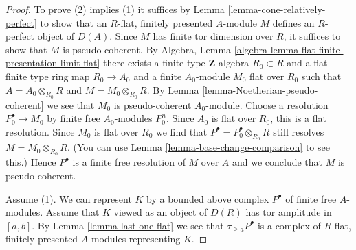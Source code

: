 \documentclass[10pt,a4paper]{amsart}
\theoremstyle{plain}
\theoremstyle{definition}
\theoremstyle{remark}
\numberwithin{equation}{subsection}
\begin{document}
\begin{proof}
To prove (2) implies (1) it suffices by
Lemma \ref{lemma-cone-relatively-perfect}
to show that an $R$-flat, finitely presented $A$-module $M$ defines
an $R$-perfect object of $D(A)$. Since $M$ has finite tor dimension
over $R$, it suffices to show that $M$ is pseudo-coherent. By
Algebra, Lemma \ref{algebra-lemma-flat-finite-presentation-limit-flat}
there exists a finite type $\mathbf{Z}$-algebra $R_0 \subset R$
and a flat finite type ring map $R_0 \to A_0$ and
a finite $A_0$-module $M_0$ flat over $R_0$ such that
$A = A_0 \otimes_{R_0} R$ and $M = M_0 \otimes_{R_0} R$. By
Lemma \ref{lemma-Noetherian-pseudo-coherent}
we see that $M_0$ is pseudo-coherent $A_0$-module.
Choose a resolution $P_0^\bullet \to M_0$ by finite free
$A_0$-modules $P_0^n$. Since $A_0$ is flat over $R_0$,
this is a flat resolution. Since $M_0$ is flat over $R_0$
we find that $P^\bullet = P_0^\bullet \otimes_{R_0} R$
still resolves $M = M_0 \otimes_{R_0} R$. (You can use
Lemma \ref{lemma-base-change-comparison} to see this.)
Hence $P^\bullet$ is a finite free resolution of $M$
over $A$ and we conclude that $M$ is pseudo-coherent.

\medskip\noindent
Assume (1). We can represent $K$ by a bounded above complex
$P^\bullet$ of finite free $A$-modules. Assume that
$K$ viewed as an object of $D(R)$ has tor amplitude in $[a, b]$.
By Lemma \ref{lemma-last-one-flat} we see that
$\tau_{\geq a}P^\bullet$ is a complex of $R$-flat, finitely
presented $A$-modules representing $K$.
\end{proof}
\end{document}
